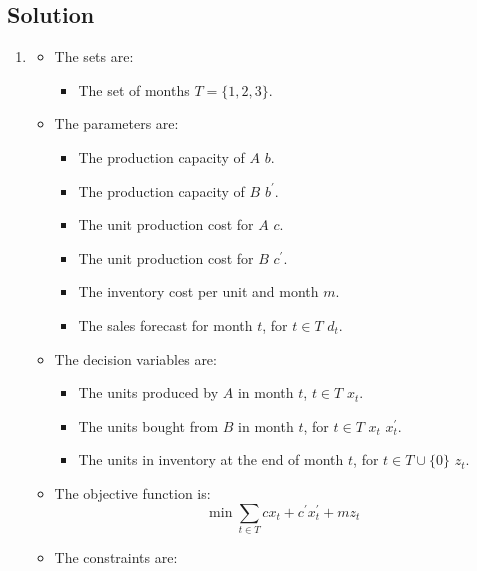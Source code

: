\documentclass[12pt, a4paper]{report}
\begin{document}
    \subsection*{Solution}
        \begin{enumerate}
            \item \begin{itemize}
                    \item The sets are: 
                        \begin{itemize}
                            \item The set of months $T=\{1,2,3\}$. 
                        \end{itemize}
                    \item The parameters are: 
                        \begin{itemize}
                            \item The production capacity of $A$ $b$. 
                            \item The production capacity of $B$ $b^{'}$. 
                            \item The unit production cost for $A$ $c$. 
                            \item The unit production cost for $B$ $c^{'}$. 
                            \item The inventory cost per unit and month $m$. 
                            \item The sales forecast for month $t$, for $t \in T$ $d_t$. 
                        \end{itemize}
                    \item The decision variables are:
                        \begin{itemize}
                            \item The units produced by $A$ in month $t$, $t \in T$ $x_t$. 
                            \item The units bought from $B$ in month $t$, for $t \in T$ $x_t$ $x_t^{'}$.
                            \item The units in inventory at the end of month $t$, for $t \in T \cup \{0\}$ $z_t$. 
                        \end{itemize}
                    \item The objective function is: 
                        \[\min{\sum_{t \in T}{cx_t+c^{'}x_t^{'}+mz_t}}\]
                    \item The constraints are:

\end{itemize}
\end{enumerate}
\end{document}

